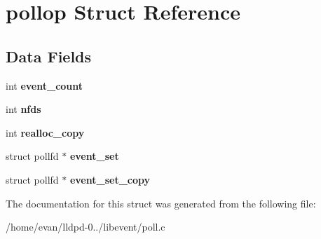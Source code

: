 \section{pollop \-Struct \-Reference}
\label{structpollop}
\subsection*{\-Data \-Fields}
\begin{DoxyCompactItemize}
\item 
int {\bfseries event\-\_\-count}\label{structpollop_ab92424784d1d3b3b593a0d9157d7de62}

\item 
int {\bfseries nfds}\label{structpollop_a0968571d264411bba407e2ba2f4814b9}

\item 
int {\bfseries realloc\-\_\-copy}\label{structpollop_a381f1e7d8eda46b708ce116affc1b397}

\item 
struct pollfd $\ast$ {\bfseries event\-\_\-set}\label{structpollop_a6a0c51af1114f55b9bb6cb7e8c137abd}

\item 
struct pollfd $\ast$ {\bfseries event\-\_\-set\-\_\-copy}\label{structpollop_a8e96cea69fdc535e6ab49eeee0d93067}

\end{DoxyCompactItemize}


\-The documentation for this struct was generated from the following file\-:\begin{DoxyCompactItemize}
\item 
/home/evan/lldpd-\/0../libevent/poll.\-c\end{DoxyCompactItemize}
